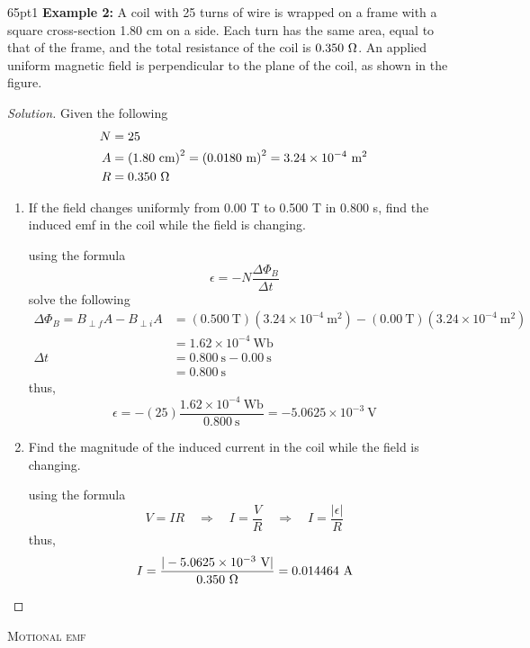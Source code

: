 \documentclass[12pt]{article}
\begin{document}
		\begin{hangparas}{65pt}{1}
			\textbf{Example 2:} A coil with 25 turns of wire is wrapped on a frame with a square cross-section 1.80 cm on a side. Each turn has the same area, equal to that of the frame, and the total resistance of the coil is \(0.350~\ohm\). An applied uniform magnetic field is perpendicular to the plane of the coil, as shown in the figure.
		\end{hangparas}
		
		\begin{proof}[Solution]
			Given the following
			\begin{align*}
				N & = 25 \\
				A & = \left(1.80~\text{cm}\right)^2 = \left(0.0180~\text{m}\right)^2 = 3.24\times10^{-4}~\text{m}^2 \\
				R & = 0.350~\ohm
			\end{align*}
			\begin{enumerate}
				\item[(a)] If the field changes uniformly from 0.00 T to 0.500 T in 0.800 s, find the induced emf in the coil while the field is changing.
				
					using the formula
					\[\epsilon = -N \frac{\Delta\Phi_B}{\Delta t}\]
					solve the following
					\begin{align*}
						\Delta\Phi_B = B_{\perp f}A-B_{\perp i}A & = \left(0.500~\text{T}\right)\left(3.24\times10^{-4}~\text{m}^2\right)-\left(0.00~\text{T}\right)\left(3.24\times10^{-4}~\text{m}^2\right) \\
						& = 1.62\times10^{-4}~\text{Wb} \\
						\Delta t & = 0.800~\text{s}-0.00~\text{s} \\
						& = 0.800~\text{s}
					\end{align*}
					thus,
					\[\epsilon = -\left(25\right)\frac{1.62\times10^{-4}~\text{Wb}}{0.800~\text{s}} = -5.0625\times10^{-3}~\text{V}\]
					
				\item[(b)] Find the magnitude of the induced current in the coil while the field is changing.
				
					using the formula
					\[V = IR \quad \Rightarrow \quad I = \frac{V}{R} \quad \Rightarrow \quad I = \frac{|\epsilon|}{R}\]
					thus,
					\[I = \frac{|-5.0625\times10^{-3}~\text{V}|}{0.350~\ohm} = 0.014464~\text{A}\]
			\end{enumerate}
		\end{proof}
	\newpage
		\begin{center}
			\hrulefill \quad \textsc{Motional emf} \quad \hrulefill
		\end{center}
		
\end{document}
